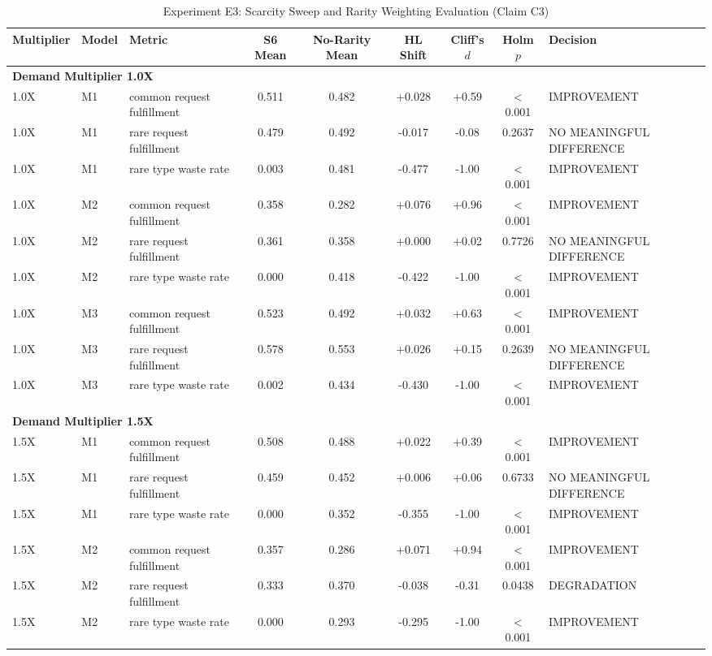 \begin{table}[t]
\centering
\small
\caption{Experiment E3: Scarcity Sweep and Rarity Weighting Evaluation (Claim C3)}
\label{tab:e3_scarcity}
\begin{tabular}{lllcccccl}
\toprule
Multiplier & Model & Metric & S6 Mean & No-Rarity Mean & HL Shift & Cliff's $d$ & Holm $p$ & Decision \\
\midrule
\multicolumn{9}{l}{\textbf{Demand Multiplier 1.0X}} \\
\midrule
1.0X & M1 & common request fulfillment & 0.511 & 0.482 & +0.028 & +0.59 & < 0.001 & IMPROVEMENT \\
1.0X & M1 & rare request fulfillment & 0.479 & 0.492 & -0.017 & -0.08 & 0.2637 & NO MEANINGFUL DIFFERENCE \\
1.0X & M1 & rare type waste rate & 0.003 & 0.481 & -0.477 & -1.00 & < 0.001 & IMPROVEMENT \\
1.0X & M2 & common request fulfillment & 0.358 & 0.282 & +0.076 & +0.96 & < 0.001 & IMPROVEMENT \\
1.0X & M2 & rare request fulfillment & 0.361 & 0.358 & +0.000 & +0.02 & 0.7726 & NO MEANINGFUL DIFFERENCE \\
1.0X & M2 & rare type waste rate & 0.000 & 0.418 & -0.422 & -1.00 & < 0.001 & IMPROVEMENT \\
1.0X & M3 & common request fulfillment & 0.523 & 0.492 & +0.032 & +0.63 & < 0.001 & IMPROVEMENT \\
1.0X & M3 & rare request fulfillment & 0.578 & 0.553 & +0.026 & +0.15 & 0.2639 & NO MEANINGFUL DIFFERENCE \\
1.0X & M3 & rare type waste rate & 0.002 & 0.434 & -0.430 & -1.00 & < 0.001 & IMPROVEMENT \\
\midrule
\multicolumn{9}{l}{\textbf{Demand Multiplier 1.5X}} \\
\midrule
1.5X & M1 & common request fulfillment & 0.508 & 0.488 & +0.022 & +0.39 & < 0.001 & IMPROVEMENT \\
1.5X & M1 & rare request fulfillment & 0.459 & 0.452 & +0.006 & +0.06 & 0.6733 & NO MEANINGFUL DIFFERENCE \\
1.5X & M1 & rare type waste rate & 0.000 & 0.352 & -0.355 & -1.00 & < 0.001 & IMPROVEMENT \\
1.5X & M2 & common request fulfillment & 0.357 & 0.286 & +0.071 & +0.94 & < 0.001 & IMPROVEMENT \\
1.5X & M2 & rare request fulfillment & 0.333 & 0.370 & -0.038 & -0.31 & 0.0438 & DEGRADATION \\
1.5X & M2 & rare type waste rate & 0.000 & 0.293 & -0.295 & -1.00 & < 0.001 & IMPROVEMENT \\

\end{tabular}
\end{table}
